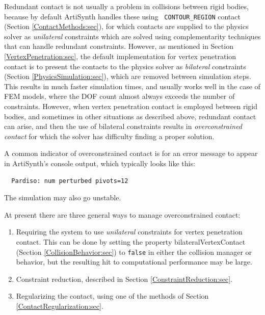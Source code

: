 Redundant contact is not usually a problem in collisions between rigid
bodies, because by default ArtiSynth handles these using {\tt
CONTOUR\_REGION} contact (Section \ref{ContactMethods:sec}), for
which contacts are supplied to the physics solver as {\it unilateral}
constraints which are solved using complementarity techniques
that can handle redundant constraints. However, as mentioned in
Section \ref{VertexPenetration:sec}, the default implementation for
vertex penetration contact is to present the contacts to the
physics solver as {\it bilateral} constraints (Section
\ref{PhysicsSimulation:sec}), which are removed between simulation
steps. This results in much faster simulation times, and usually works
well in the case of FEM models, where the DOF count almost always
exceeds the number of constraints. However, when vertex penetration
contact is employed between rigid bodies, and sometimes in other
situations as described above, redundant contact can arise, and then
the use of bilateral constraints results in {\it overconstrained
contact} for which the solver has difficulty finding a proper
solution.

A common indicator of overconstrained contact is for an error message
to appear in ArtiSynth's console output, which typically looks like
this:
%
\begin{verbatim}
  Pardiso: num perturbed pivots=12
\end{verbatim}
%
The simulation may also go unstable.

At present there are three general ways to manage overconstrained
contact: 

\begin{enumerate}

\item Requiring the system to use {\it unilateral} constraints for
vertex penetration contact. This can be done by setting the
property {\sf bilateralVertexContact} (Section
\ref{CollisionBehavior:sec}) to {\tt false} in either the collision
manager or behavior, but the resulting hit to computational
performance may be large.

\item Constraint reduction, described in Section
\ref{ConstraintReduction:sec}.

\item Regularizing the contact, using one of the methods
of Section \ref{ContactRegularization:sec}.

\end{enumerate}


